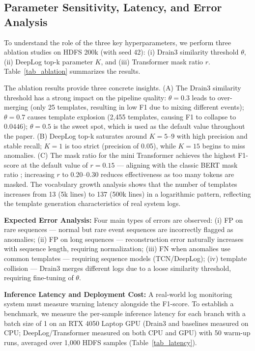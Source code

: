 \documentclass[conference]{IEEEtran}
\begin{document}
\subsection{Parameter Sensitivity, Latency, and Error Analysis}
\label{sec:ablation}
To understand the role of the three key hyperparameters, we perform three ablation studies on HDFS 200k (with seed 42): (i) Drain3 similarity threshold $\theta$, (ii) DeepLog top-k parameter $K$, and (iii) Transformer mask ratio $r$. Table~\ref{tab_ablation} summarizes the results.



The ablation results provide three concrete insights. (A) The Drain3 similarity threshold has a strong impact on the pipeline quality: $\theta{=}0.3$ leads to over-merging (only 25 templates, resulting in low F1 due to mixing different events); $\theta{=}0.7$ causes template explosion (2,455 templates, causing F1 to collapse to $0.0446$); $\theta{=}0.5$ is the sweet spot, which is used as the default value throughout the paper. (B) DeepLog top-k saturates around $K{=}5$--$9$ with high precision and stable recall; $K{=}1$ is too strict (precision of 0.05), while $K{=}15$ begins to miss anomalies. (C) The mask ratio for the mini Transformer achieves the highest F1-score at the default value of $r{=}0.15$ — aligning with the classic BERT mask ratio \cite{b4}; increasing $r$ to 0.20--0.30 reduces effectiveness as too many tokens are masked. The vocabulary growth analysis shows that the number of templates increases from 13 (5k lines) to 137 (500k lines) in a logarithmic pattern, reflecting the template generation characteristics of real system logs.

\textbf{Expected Error Analysis:} Four main types of errors are observed: (i) FP on rare sequences — normal but rare event sequences are incorrectly flagged as anomalies; (ii) FP on long sequences — reconstruction error naturally increases with sequence length, requiring normalization; (iii) FN when anomalies use common templates — requiring sequence models (TCN/DeepLog); (iv) template collision — Drain3 merges different logs due to a loose similarity threshold, requiring fine-tuning of $\theta$.

\textbf{Inference Latency and Deployment Cost:} A real-world log monitoring system must measure warning latency alongside the F1-score. To establish a benchmark, we measure the per-sample inference latency for each branch with a batch size of 1 on an RTX 4050 Laptop GPU (Drain3 and baselines measured on CPU; DeepLog/Transformer measured on both CPU and GPU) with 50 warm-up runs, averaged over 1,000 HDFS samples (Table~\ref{tab_latency}).
\end{document}
